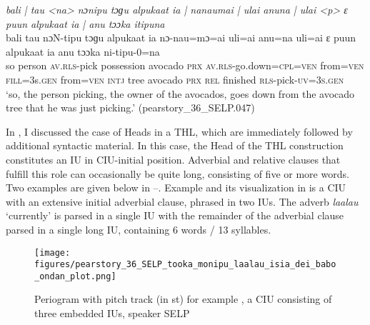 \ea
\label{ex:bali tau }
\textit{bali | tau <na> nɔnipu tɔɡu alpukaat ia | nanaumai | ulai anuna | ulai <p> ɛ puun alpukaat ia | anu tɔɔka itipuna} \\
\gll bali tau  nɔN-tipu tɔɡu alpukaat ia nɔ-nau=mɔ=ai uli=ai anu=na uli=ai  ɛ puun alpukaat ia anu tɔɔka ni-tipu-0=na  \\
so person  \textsc{av.rls}-pick possession avocado \textsc{prx} \textsc{av.rls}-go.down\textsc{=cpl=ven } from=\textsc{ven} \textsc{fill}=3s.\textsc{gen} from=\textsc{ven}  \textsc{intj} tree avocado \textsc{prx} \textsc{rel} finished \textsc{rls-}pick\textsc{-uv}=3\textsc{s}.\textsc{gen}\\ 
\glt ‘so, the person picking, the owner of the avocados, goes down
from the avocado tree that he was just picking.’ \hfill(pearstory\_36\_SELP.047)
\z





In   , I discussed the case of Heads in a THL,  which are immediately followed by additional syntactic material. In this case, the Head of the THL construction constitutes an IU in CIU-initial position. Adverbial and relative clauses that fulfill this role can occasionally be quite long, consisting of five or more words. Two examples are given below in --.
Example  and its visualization in   is a CIU with an extensive initial adverbial clause, phrased in two IUs. The adverb \textit{laalau} `currently' is parsed in a single IU with the remainder of the adverbial clause parsed in a single long IU, containing 6 words / 13 syllables.

\begin{figure}	\texttt{[image: figures/pearstory\_36\_SELP\_tooka\_monipu\_laalau\_isia\_dei\_babo\_ondan\_plot.png]}
	\caption{Periogram with pitch track (in st) for example , a CIU consisting of three embedded IUs, speaker SELP}
	\label{pitch:{ex:tooka_monipu_laalau_isia_dei_babo_ondan}}
\end{figure}


